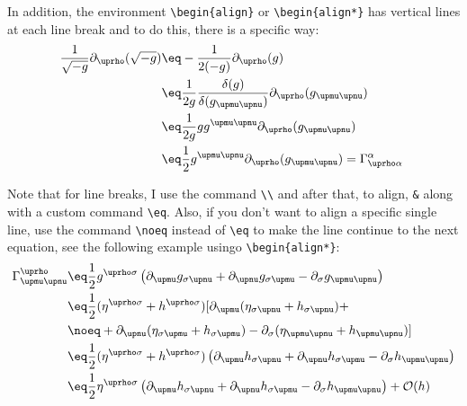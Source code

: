 \documentclass{solutionclass} %
\begin{document}
        In addition, the environment \verb|\begin{align}| or \verb|\begin{align*}| has vertical lines at each line break and to do this, there is a specific way:
            \begin{align}
                \dfrac{1}{\sqrt{-g}}\partial_{\uprho}(\sqrt{-g}) & \eq -\dfrac{1}{2(-g)}\partial_{\uprho}(g) \label{eq: 2} \\
                & \eq \dfrac{1}{2g}\dfrac{\delta(g)}{\delta(g_{\upmu\upnu})}\partial_{\uprho}(g_{\upmu\upnu}) \nonumber \\
                & \eq \dfrac{1}{2g}gg^{\upmu\upnu}\partial_{\uprho}(g_{\upmu\upnu}) \nonumber \\
                & \eq \dfrac{1}{2}g^{\upmu\upnu}\partial_{\uprho}(g_{\upmu\upnu}) = \Gamma^{\alpha}_{\uprho\alpha}\ \label{eq:3}
            \end{align}

        Note that for line breaks, I use the command \verb|\\| and after that, to align, \verb|&| along with a custom command \verb|\eq|. Also, if you don't want to align a specific single line, use the command \verb|\noeq| instead of \verb|\eq| to make the line continue to the next equation, see the following example usingo \verb|\begin{align*}|:
            \begin{align*}
                \Gamma^{\uprho}_{\upmu\upnu} & \eq \dfrac{1}{2}g^{\uprho\sigma}\left(
                    \partial_{\upmu}g_{\sigma\upnu} + 
                    \partial_{\upnu}g_{\sigma\upmu} -
                    \partial_{\sigma}g_{\upmu\upnu}
                \right) \\
                & \eq \dfrac{1}{2}(\eta^{\uprho\sigma} + h^{\uprho\sigma})[
                    \partial_{\upmu}(\eta_{\sigma\upnu} + h_{\sigma\upnu}) +  \\
                & \noeq + \partial_{\upnu}(\eta_{\sigma\upmu} + h_{\sigma\upmu}) -
                    \partial_{\sigma}(\eta_{\upmu\upnu} + h_{\upmu\upnu}) ]  \\
                & \eq \dfrac{1}{2}(\eta^{\uprho\sigma} + h^{\uprho\sigma})\left(
                    \partial_{\upmu}h_{\sigma\upnu} + 
                    \partial_{\upnu}h_{\sigma\upmu} - 
                    \partial_{\sigma}h_{\upmu\upnu}
                \right)  \\
                & \eq \dfrac{1}{2}\eta^{\uprho\sigma} \left(
                    \partial_{\upmu}h_{\sigma\upnu} + 
                    \partial_{\upnu}h_{\sigma\upmu} - 
                    \partial_{\sigma}h_{\upmu\upnu}
                \right) + \mathcal{O}(h) 
            \end{align*}
    
\end{document}
